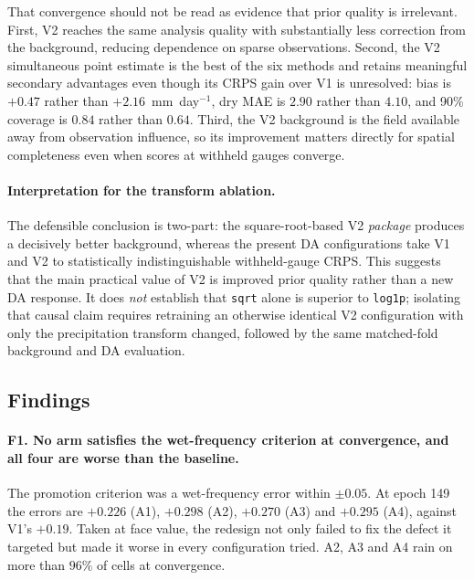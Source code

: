 That convergence should not be read as evidence that prior quality is
irrelevant. First, V2 reaches the same analysis quality with substantially less
correction from the background, reducing dependence on sparse observations.
Second, the V2 simultaneous point estimate is the best of the six methods and
retains meaningful secondary advantages even though its CRPS gain over V1 is
unresolved: bias is $+0.47$ rather than $+2.16$~mm~day$^{-1}$, dry MAE is
$2.90$ rather than $4.10$, and 90\% coverage is $0.84$ rather than $0.64$.
Third, the V2 background is the field available away from observation
influence, so its improvement matters directly for spatial completeness even
when scores at withheld gauges converge.

\paragraph{Interpretation for the transform ablation.}
The defensible conclusion is two-part: the square-root-based V2 \emph{package}
produces a decisively better background, whereas the present DA configurations
take V1 and V2 to statistically indistinguishable withheld-gauge CRPS. This
suggests that the main practical value of V2 is improved prior quality rather
than a new DA response. It does \emph{not} establish that \texttt{sqrt} alone
is superior to \texttt{log1p}; isolating that causal claim requires retraining
an otherwise identical V2 configuration with only the precipitation transform
changed, followed by the same matched-fold background and DA evaluation.


\subsection{Findings}
\label{sec:abl-findings}

\paragraph{F1. No arm satisfies the wet-frequency criterion at convergence, and
all four are worse than the baseline.} The promotion criterion was a
wet-frequency error within $\pm 0.05$. At epoch 149 the errors are $+0.226$
(A1), $+0.298$ (A2), $+0.270$ (A3) and $+0.295$ (A4), against V1's $+0.19$.
Taken at face value, the redesign not only failed to fix the defect it targeted
but made it worse in every configuration tried. A2, A3 and A4 rain on more than
$96\%$ of cells at convergence.

